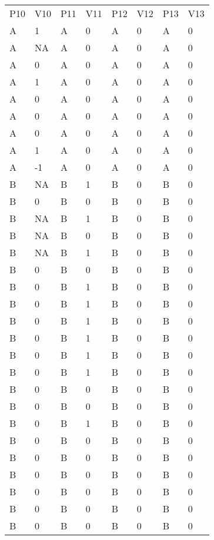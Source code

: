 \documentclass{article}
\begin{document}
\begin{table}

  
\begin{tabular}{l  l  l  l  l  l  l  l}

  P10 & V10 & P11 & V11 & P12 & V12 & P13 & V13\\
A & 1 & A & 0 & A & 0 & A & 0\\
A & NA & A & 0 & A & 0 & A & 0\\
A & 0 & A & 0 & A & 0 & A & 0\\
A & 1 & A & 0 & A & 0 & A & 0\\
A & 0 & A & 0 & A & 0 & A & 0\\
A & 0 & A & 0 & A & 0 & A & 0\\
A & 0 & A & 0 & A & 0 & A & 0\\
A & 1 & A & 0 & A & 0 & A & 0\\
A & -1 & A & 0 & A & 0 & A & 0\\
B & NA & B & 1 & B & 0 & B & 0\\
B & 0 & B & 0 & B & 0 & B & 0\\
B & NA & B & 1 & B & 0 & B & 0\\
B & NA & B & 0 & B & 0 & B & 0\\
B & NA & B & 1 & B & 0 & B & 0\\
B & 0 & B & 0 & B & 0 & B & 0\\
B & 0 & B & 1 & B & 0 & B & 0\\
B & 0 & B & 1 & B & 0 & B & 0\\
B & 0 & B & 1 & B & 0 & B & 0\\
B & 0 & B & 1 & B & 0 & B & 0\\
B & 0 & B & 1 & B & 0 & B & 0\\
B & 0 & B & 1 & B & 0 & B & 0\\
B & 0 & B & 0 & B & 0 & B & 0\\
B & 0 & B & 0 & B & 0 & B & 0\\
B & 0 & B & 1 & B & 0 & B & 0\\
B & 0 & B & 0 & B & 0 & B & 0\\
B & 0 & B & 0 & B & 0 & B & 0\\
B & 0 & B & 0 & B & 0 & B & 0\\
B & 0 & B & 0 & B & 0 & B & 0\\
B & 0 & B & 0 & B & 0 & B & 0\\
B & 0 & B & 0 & B & 0 & B & 0\\


\end{tabular}


\end{table}
\end{document}
